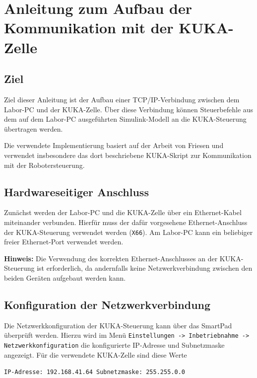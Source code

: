 \appendix
{}

\section{Anleitung zum Aufbau der Kommunikation mit der KUKA-Zelle}
\label{sec:anleitung_kuka_kommunikation}

\subsection{Ziel}

Ziel dieser Anleitung ist der Aufbau einer TCP/IP-Verbindung zwischen
dem Labor-PC und der KUKA-Zelle. Über diese Verbindung können
Steuerbefehle aus dem auf dem Labor-PC ausgeführten Simulink-Modell an
die KUKA-Steuerung übertragen werden.

Die verwendete Implementierung basiert auf der Arbeit von Friesen
\cite{friesen2021} und verwendet insbesondere das dort beschriebene
KUKA-Skript zur Kommunikation mit der Robotersteuerung.

\subsection{Hardwareseitiger Anschluss}

Zunächst werden der Labor-PC und die KUKA-Zelle über ein
Ethernet-Kabel miteinander verbunden. Hierfür muss der dafür
vorgesehene Ethernet-Anschluss der KUKA-Steuerung verwendet werden
(\texttt{X66}). Am Labor-PC kann ein beliebiger freier Ethernet-Port
verwendet werden.

\textbf{Hinweis:} Die Verwendung des korrekten Ethernet-Anschlusses an
der KUKA-Steuerung ist erforderlich, da andernfalls keine
Netzwerkverbindung zwischen den beiden Geräten aufgebaut werden kann.

\subsection{Konfiguration der Netzwerkverbindung}

Die Netzwerkkonfiguration der KUKA-Steuerung kann über das SmartPad
überprüft werden. Hierzu wird im Menü
\texttt{Einstellungen -> Inbetriebnahme -> Netzwerkkonfiguration}
die konfigurierte IP-Adresse und Subnetzmaske angezeigt. Für die
verwendete KUKA-Zelle sind diese Werte

\begin{center}
\texttt{IP-Adresse: 192.168.41.64}\
\texttt{Subnetzmaske: 255.255.0.0}
\end{center}

